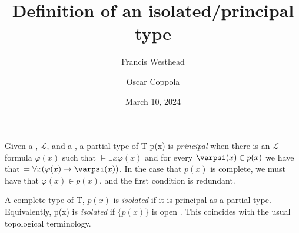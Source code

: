 \documentclass[a4paper]{article}
\title{Definition of an isolated/principal type}
\date{March 10, 2024}
\author{Francis Westhead \and Oscar Coppola}
\begin{document}
\maketitle
\par{
    Given a , \(\mathcal {L}\), and a ,
    a partial type of T {p(x)} is \emph{principal} when there is an \(\mathcal {L}\)-formula \(\varphi (x)\) such that
    \(\models   \exists  x  \varphi (x)\) and for every \(\varpsi (x)  \in  p(x)\) we have that
    \(\models   \forall  x ( \varphi (x)  \rightarrow   \varpsi (x))\).
    In the case that \(p(x)\) is complete, we must have that \(\varphi (x) \in  p(x)\),
    and the first condition is redundant.
}\par{
    A complete type of T, \(p(x)\) is \emph{isolated} if it is principal as a partial type.
    Equivalently, {p(x)} is \emph{isolated} if \(\{ p(x) \}\) is open .
    This coincides with the usual topological terminology.
}
\printbibliography
\end{document}

